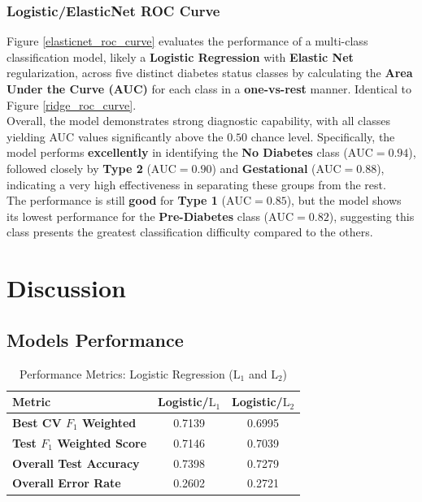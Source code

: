 \documentclass[conference]{IEEEtran}
\begin{document}
\subsubsection{Logistic/ElasticNet ROC Curve} Figure \ref{elasticnet_roc_curve} evaluates the performance of a multi-class classification model, likely a \textbf{Logistic Regression} with \textbf{Elastic Net} regularization, across five distinct diabetes status classes by calculating the \textbf{Area Under the Curve (AUC)} for each class in a \textbf{one-vs-rest} manner. Identical to Figure \ref{ridge_roc_curve}.\\
\indent Overall, the model demonstrates strong diagnostic capability, with all classes yielding AUC values significantly above the $0.50$ chance level. Specifically, the model performs \textbf{excellently} in identifying the \textbf{No Diabetes} class ($\text{AUC} = 0.94$), followed closely by \textbf{Type 2} ($\text{AUC} = 0.90$) and \textbf{Gestational} ($\text{AUC} = 0.88$), indicating a very high effectiveness in separating these groups from the rest.\\
\indent The performance is still \textbf{good} for \textbf{Type 1} ($\text{AUC} = 0.85$), but the model shows its lowest performance for the \textbf{Pre-Diabetes} class ($\text{AUC} = 0.82$), suggesting this class presents the greatest classification difficulty compared to the others.

\section{\textbf{Discussion}}

\subsection{Models Performance}

\begin{table}[h!]
	\centering
	\caption{Performance Metrics: Logistic Regression ($\text{L}_1$ and $\text{L}_2$)}
	\label{tab:logreg_l1_l2_performance}
	\begin{tabular}{|l|c|c|}
		\hline
		\textbf{Metric} & \textbf{Logistic/$\text{L}_1$} & \textbf{Logistic/$\text{L}_2$} \\
		\hline
		\textbf{Best CV  $F_1$ Weighted} & 0.7139 & 0.6995 \\
		\hline
		\textbf{Test $F_1$ Weighted Score} & 0.7146 & 0.7039 \\
		\hline
		\textbf{Overall Test Accuracy} & 0.7398 & 0.7279 \\
		\hline
		\textbf{Overall Error Rate} & 0.2602 & 0.2721 \\
		\hline
	\end{tabular}
\end{table}
\end{document}
